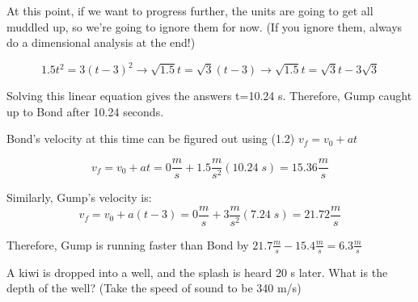 \begin{solution}
At this point, if we want to progress further, the units are going to get all muddled up, so we're going to ignore them for now. (If you ignore them, always do a dimensional analysis at the end!)

\begin{equation*}
    1.5t^2 = 3(t-3)^2 \rightarrow
    \sqrt{1.5}t = \sqrt{3}(t-3) \rightarrow
    \sqrt{1.5}t = \sqrt{3}t-3\sqrt{3}
\end{equation*}

Solving this linear equation gives the answers t=10.24 s. Therefore, Gump caught up to Bond after 10.24 seconds.

Bond's velocity at this time can be figured out using (1.2) $v_f=v_0+at$

\begin{equation*}
    v_f=v_0+at =
    0\frac{m}{s} + 1.5\frac{m}{s^2}(10.24\;s) =  
    15.36\frac{m}{s}
\end{equation*}

Similarly, Gump's velocity is:
\begin{equation*}
    v_f=v_0+a(t-3) = 
    0\frac{m}{s} + 3\frac{m}{s^2}(7.24\;s) =  
    21.72\frac{m}{s}
\end{equation*}

Therefore, Gump is running faster than Bond by $21.7\frac{m}{s}-15.4\frac{m}{s}=6.3\frac{m}{s}$

\end{solution}


\begin{question}
A kiwi is dropped into a well, and the splash is heard 20 s later. What is the depth of the well? (Take the speed of sound to be 340 m/s)
\end{question}

